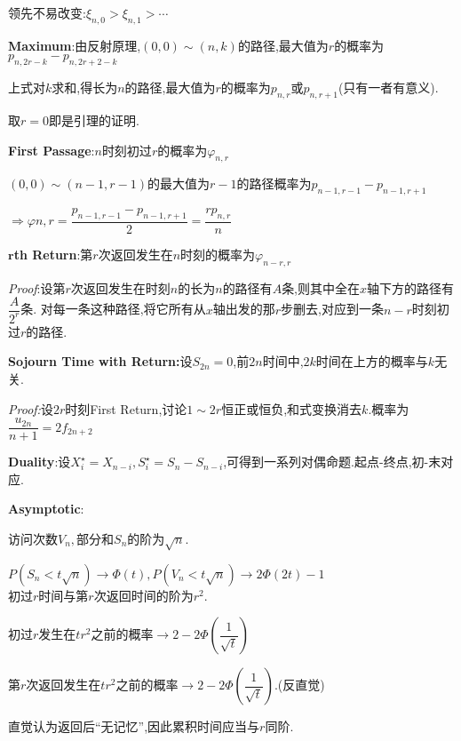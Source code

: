 领先不易改变:$ \xi_{n,0}>\xi_{n,1}>\cdots $
\vspace{0.6cm}

\textbf{Maximum}:由反射原理,$ (0,0)\sim (n,k)$的路径,最大值为$ r$的概率为$ p_{n,2r-k}-p_{n,2r+2-k}$

上式对$ k$求和,得长为$ n$的路径,最大值为$ r$的概率为$ p_{n,r}或p_{n,r+1}$(只有一者有意义).

取$ r=0$即是引理的证明.
\vspace{0.6cm}

\textbf{First Passage}:$ n$时刻初过$ r$的概率为$\varphi_{n,r}$

$(0,0)\sim (n-1,r-1) $的最大值为$ r-1$的路径概率为$ p_{n-1,r-1}-p_{n-1,r+1}$

$ \Rightarrow \varphi{n,r} = \dfrac{p_{n-1,r-1}-p_{n-1,r+1}}{2} = \dfrac{rp_{n,r}}{n}$
\vspace{0.6cm}

\textbf{$ \mathbf{r}$th Return}:第$ r$次返回发生在$ n$时刻的概率为$ \varphi_{n-r,r}$

\textit{Proof}:设第$ r$次返回发生在时刻$ n$的长为$ n$的路径有$ A$条,则其中全在$ x$轴下方的路径有$ \dfrac{A}{2^r}$条.
对每一条这种路径,将它所有从$ x$轴出发的那$ r$步删去,对应到一条$ n-r$时刻初过$ r$的路径.
\vspace{0.6cm}

\textbf{Sojourn Time with Return:}设$ S_{2n}=0$,前$ 2n$时间中,$ 2k$时间在上方的概率与$ k$无关.

\textit{Proof:}设$ 2r$时刻First Return,讨论$ 1\sim 2r$恒正或恒负,和式变换消去$ k$.概率为$ \dfrac{u_{2n}}{n+1}=2f_{2n+2}$
\vspace{0.6cm}

\textbf{Duality}:设$ X_i^\star = X_{n-i},S_{i}^\star = S_n-S_{n-i}$,可得到一系列对偶命题.起点-终点,初-末对应.
\vspace{0.6cm}

\textbf{Asymptotic}:

访问次数$ V_n,$部分和$ S_n$的阶为$ \sqrt{n}.$

$  P(S_n < t\sqrt{n})\to \Phi(t), P(V_n < t\sqrt{n}) \to 2\Phi(2t) -1$
\\

初过$ r$时间与第$ r$次返回时间的阶为$ r^2$.

初过$ r$发生在$ tr^2$之前的概率$ \to 2 - 2 \Phi(\dfrac{1}{\sqrt{t}})$

第$ r$次返回发生在$ tr^2$之前的概率$ \to 2 - 2\Phi(\dfrac{1}{\sqrt{t}})$.(反直觉)

直觉认为返回后``无记忆'',因此累积时间应当与$ r$同阶.
